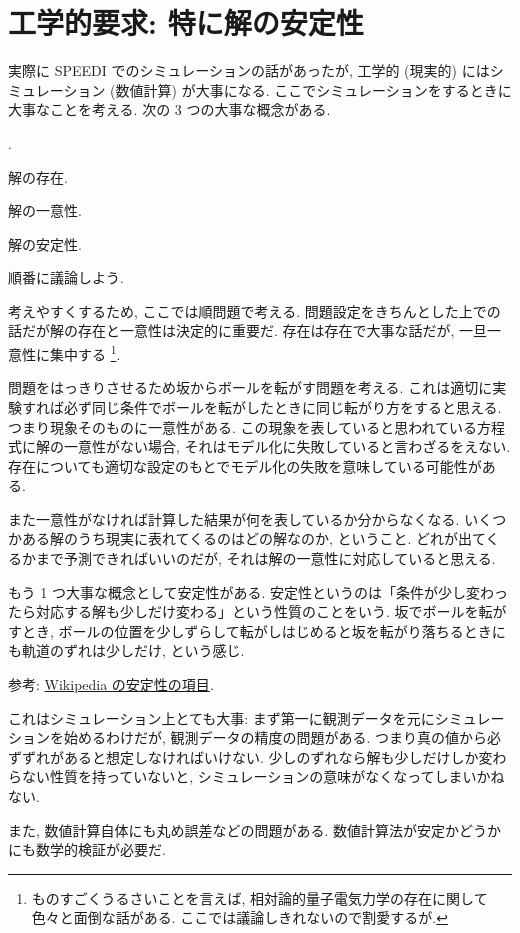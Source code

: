 \documentclass[openany, a4paper, oneside]{jsbook}
\newcounter{enum2}
\renewenvironment{enumerate}{%
\begin{list}%
{%
\arabic{enum2}.\ \,%
}%
{%
\usecounter{enum2}
\setlength{\itemindent}{0pt}%
\setlength{\leftmargin}{15pt}%
\setlength{\rightmargin}{0pt}%
\setlength{\labelsep}{0pt}%
\setlength{\labelwidth}{6pt}%
\setlength{\itemsep}{0pt}%
\setlength{\parsep}{0pt}%
\setlength{\listparindent}{0pt}%
}
}{%
\end{list}%
}
\theoremstyle{break}
\theoremstyle{breakdefn}
\begin{document}
\section{工学的要求: 特に解の安定性}


実際に SPEEDI でのシミュレーションの話があったが, 工学的 (現実的) にはシミュレーション (数値計算) が大事になる.
ここでシミュレーションをするときに大事なことを考える.
次の 3 つの大事な概念がある.
\begin{enumerate}
\item 解の存在.
\item 解の一意性.
\item 解の安定性.
\end{enumerate}
順番に議論しよう.

考えやすくするため, ここでは順問題で考える.
問題設定をきちんとした上での話だが解の存在と一意性は決定的に重要だ.
存在は存在で大事な話だが, 一旦一意性に集中する \footnote{ものすごくうるさいことを言えば, 相対論的量子電気力学の存在に関して色々と面倒な話がある. ここでは議論しきれないので割愛するが.
 }.

問題をはっきりさせるため坂からボールを転がす問題を考える.
これは適切に実験すれば必ず同じ条件でボールを転がしたときに同じ転がり方をすると思える.
つまり現象そのものに一意性がある.
この現象を表していると思われている方程式に解の一意性がない場合,
それはモデル化に失敗していると言わざるをえない.
存在についても適切な設定のもとでモデル化の失敗を意味している可能性がある.

また一意性がなければ計算した結果が何を表しているか分からなくなる.
いくつかある解のうち現実に表れてくるのはどの解なのか, ということ.
どれが出てくるかまで予測できればいいのだが, それは解の一意性に対応していると思える.

もう 1 つ大事な概念として安定性がある.
安定性というのは「条件が少し変わったら対応する解も少しだけ変わる」という性質のことをいう.
坂でボールを転がすとき,
ボールの位置を少しずらして転がしはじめると坂を転がり落ちるときにも軌道のずれは少しだけ, という感じ.

参考: \href{http://ja.wikipedia.org/wiki/%E5%AE%89%E5%AE%9A%E6%80%A7%E7%90%86%E8%AB%96}{Wikipedia の安定性の項目}.

これはシミュレーション上とても大事:
まず第一に観測データを元にシミュレーションを始めるわけだが,
観測データの精度の問題がある.
つまり真の値から必ずずれがあると想定しなければいけない.
少しのずれなら解も少しだけしか変わらない性質を持っていないと,
シミュレーションの意味がなくなってしまいかねない.

また, 数値計算自体にも丸め誤差などの問題がある.
数値計算法が安定かどうかにも数学的検証が必要だ.
\end{document}
